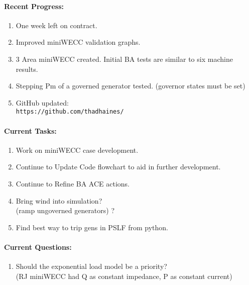 \documentclass[12pt]{article}
\begin{document}
\begin{multicols}{2}
\raggedright
	\paragraph{Recent Progress:}
	\begin{enumerate}
		\item One week left on contract.
		\item Improved miniWECC validation graphs.
		\item 3 Area miniWECC created. Initial BA tests are similar to six machine results.
		\item Stepping Pm of a governed generator tested. (governor states must be set)
		


		\item GitHub updated:\\
		\verb|https://github.com/thadhaines/|
		
	\end{enumerate}
\paragraph{Current Tasks:}
	\begin{enumerate}
		\item Work on miniWECC case development.

		\item Continue to Update Code flowchart to aid in further development.

		\item Continue to Refine BA ACE actions.

		\item Bring wind into simulation? \\ (ramp ungoverned generators) ?

		\item Find best way to trip gens in PSLF from python.

		
		

	\end{enumerate}

	\paragraph{Current Questions:}
	\begin{enumerate}
	\item Should the exponential load model be a priority?\\
(RJ miniWECC had Q as constant impedance, P as constant current)


\end{enumerate}
\end{multicols}
\end{document}
